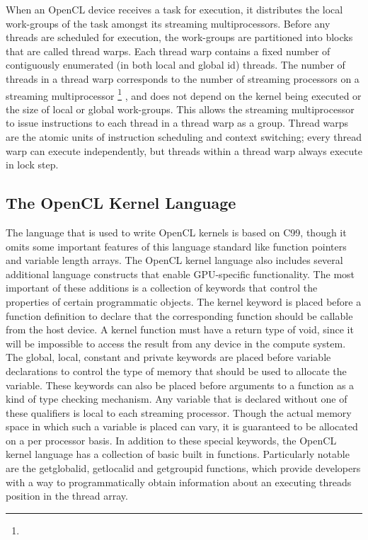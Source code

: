 \documentclass[12pt,twoside]{reedthesis}
\begin{document}
When an OpenCL device receives a task for execution, it distributes the local work-groups of the task amongst its streaming multiprocessors. Before any threads are scheduled for execution, the work-groups are partitioned into blocks that are called thread warps. Each thread warp contains a fixed number of contiguously enumerated (in both local and global id) threads. The number of threads in a thread warp corresponds to the number of streaming processors on a streaming multiprocessor
\footnote{}
, and does not depend on the kernel being executed or the size of local or global work-groups. This allows the streaming multiprocessor to issue instructions to each thread in a thread warp as a group. Thread warps are the atomic units of instruction scheduling and context switching; every thread warp can execute independently, but threads within a thread warp always execute in lock step.

\subsection{The OpenCL Kernel Language}

The language that is used to write OpenCL kernels is based on C99, though it omits some important features of this language standard like function pointers and variable length arrays. The OpenCL kernel language also includes several additional language constructs that enable GPU-specific functionality. The most important of these additions is a collection of keywords that control the properties of certain programmatic objects.
The kernel keyword is placed before a function definition to declare that the corresponding function should be callable from the host device. A kernel function must have a return type of void, since it will be impossible to access the result from any device in the compute system.
The global, local, constant and private keywords are placed before variable declarations to control the type of memory that should be used to allocate the variable. These keywords can also be placed before arguments to a function as a kind of type checking mechanism. Any variable that is declared without one of these qualifiers is local to each streaming processor. Though the actual memory space in which such a variable is placed can vary, it is guaranteed to be allocated on a per processor basis.
In addition to these special keywords, the OpenCL kernel language has a collection of basic built in functions. Particularly notable are the getglobalid, getlocalid and getgroupid functions, which provide developers with a way to programmatically obtain information about an executing threads position in the thread array.
\end{document}
